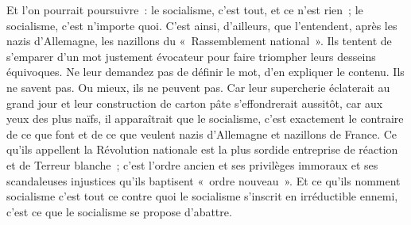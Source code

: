 \documentclass[french,twoside]{book} %
\begin{document}
Et l’on pourrait poursuivre : le socialisme, c’est tout, et ce n’est rien ; le socialisme, c’est n’importe quoi. C’est ainsi, d’ailleurs, que l’entendent, après les nazis d’Allemagne, les nazillons du « Rassemblement national ». Ils tentent de s’emparer d’un mot justement évocateur pour faire triompher leurs desseins équivoques. Ne leur demandez pas de définir   le mot, d’en expliquer le contenu. Ils ne savent pas. Ou mieux, ils ne peuvent pas. Car leur supercherie éclaterait au grand jour et leur construction de carton pâte s’effondrerait aussitôt, car aux yeux des plus naïfs, il apparaîtrait que le socialisme, c’est exactement le contraire de ce que font et de ce que veulent nazis d’Allemagne et nazillons de France. Ce qu’ils appellent la Révolution nationale est la plus sordide entreprise de réaction et de Terreur blanche ; c’est l’ordre ancien et ses privilèges immoraux et ses scandaleuses injustices qu’ils baptisent « ordre nouveau ». Et ce qu’ils nomment socialisme c’est tout ce contre quoi le socialisme s’inscrit en irréductible ennemi, c’est ce que le socialisme se propose d’abattre.
\renewcommand{\leftmark}{3 – Qu’est-ce que le socialisme ?}
\end{document}
